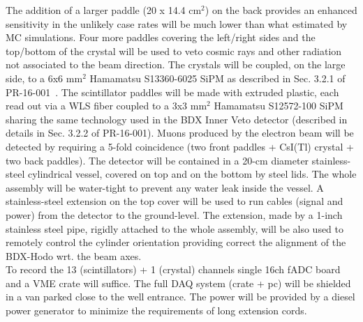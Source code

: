 The addition of a larger paddle (20 x 14.4 cm$^2$) on the back provides an enhanced sensitivity   in the unlikely  case rates will be much lower than what estimated by MC simulations.
Four more  paddles covering  the left/right sides and the top/bottom of the crystal will be used to veto cosmic rays and other radiation not associated to the beam direction.
The crystals will be coupled, on the large side,  to a 6x6 mm$^2$ Hamamatsu S13360-6025 SiPM as described in Sec. 3.2.1 of  PR-16-001~\cite{bdx-proposal}. The scintillator paddles will be  made with extruded plastic, each  read out via a WLS fiber coupled to a 3x3 mm$^2$ Hamamatsu S12572-100 SiPM sharing the same technology used in the BDX Inner Veto detector (described in details in Sec. 3.2.2 of  PR-16-001).
Muons produced by the electron beam will be detected by requiring a 5-fold coincidence (two front paddles + CsI(Tl) crystal + two back  paddles).
The detector will be contained  in a 20-cm diameter stainless-steel cylindrical vessel, covered on top and on the bottom by steel lids. The whole assembly will  be water-tight to prevent any water leak inside the vessel. A stainless-steel  extension on the top cover will be used  to run  cables (signal and power)  from the detector to the ground-level. The extension, made by a 1-inch stainless steel pipe,  rigidly attached to the whole assembly, will be also used  to remotely control the cylinder orientation  providing correct  the alignment of the BDX-Hodo wrt. the beam axes. \\
To record the 13 (scintillators) + 1 (crystal) channels   single 16ch  fADC board and  a VME crate will suffice. The full DAQ system (crate + pc)  will be shielded in a van parked close to the well entrance. The power will be provided by a diesel power generator to minimize the requirements of long extension cords.

